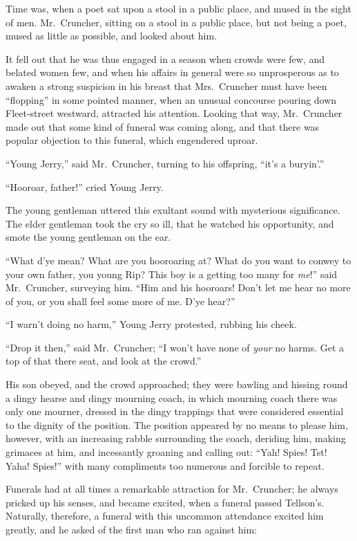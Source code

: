 Time was, when a poet sat upon a stool in a public place, and mused
in the sight of men.  Mr.\ Cruncher, sitting on a stool in a public place,
but not being a poet, mused as little as possible, and looked about him.

It fell out that he was thus engaged in a season when crowds were few,
and belated women few, and when his affairs in general were so
unprosperous as to awaken a strong suspicion in his breast that
Mrs.\ Cruncher must have been ``flopping'' in some pointed manner, when
an unusual concourse pouring down Fleet-street westward, attracted his
attention.  Looking that way, Mr.\ Cruncher made out that some kind of
funeral was coming along, and that there was popular objection to this
funeral, which engendered uproar.

``Young Jerry,'' said Mr.\ Cruncher, turning to his offspring,
``it's a buryin'.''

``Hooroar, father!'' cried Young Jerry.

The young gentleman uttered this exultant sound with mysterious
significance.  The elder gentleman took the cry so ill, that he
watched his opportunity, and smote the young gentleman on the ear.

``What d'ye mean?  What are you hooroaring at?  What do you want to
conwey to your own father, you young Rip?  This boy is a getting
too many for \emph{me}!'' said Mr.\ Cruncher, surveying him.  ``Him and
his hooroars!  Don't let me hear no more of you, or you shall feel
some more of me.  D'ye hear?''

``I warn't doing no harm,'' Young Jerry protested, rubbing his cheek.

``Drop it then,'' said Mr.\ Cruncher; ``I won't have none of \emph{your}
no harms.  Get a top of that there seat, and look at the crowd.''

His son obeyed, and the crowd approached; they were bawling and hissing
round a dingy hearse and dingy mourning coach, in which mourning coach
there was only one mourner, dressed in the dingy trappings that were
considered essential to the dignity of the position.  The position
appeared by no means to please him, however, with an increasing rabble
surrounding the coach, deriding him, making grimaces at him,
and incessantly groaning and calling out:  ``Yah!  Spies!  Tst!  Yaha!
Spies!'' with many compliments too numerous and forcible to repeat.

Funerals had at all times a remarkable attraction for Mr.\ Cruncher;
he always pricked up his senses, and became excited, when a funeral
passed Tellson's.  Naturally, therefore, a funeral with this uncommon
attendance excited him greatly, and he asked of the first man who ran
against him:

